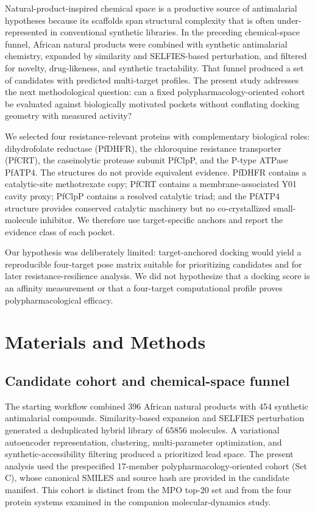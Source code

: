 \documentclass[journal=jcisd8,manuscript=article]{achemso}
\begin{document}
Natural-product-inspired chemical space is a productive source of antimalarial hypotheses because its scaffolds span structural complexity that is often under-represented in conventional synthetic libraries. In the preceding chemical-space funnel, African natural products were combined with synthetic antimalarial chemistry, expanded by similarity and SELFIES-based perturbation, and filtered for novelty, drug-likeness, and synthetic tractability. That funnel produced a set of candidates with predicted multi-target profiles. The present study addresses the next methodological question: can a fixed polypharmacology-oriented cohort be evaluated against biologically motivated pockets without conflating docking geometry with measured activity?

We selected four resistance-relevant proteins with complementary biological roles: dihydrofolate reductase (PfDHFR), the chloroquine resistance transporter (PfCRT), the caseinolytic protease subunit PfClpP, and the P-type ATPase PfATP4. The structures do not provide equivalent evidence. PfDHFR contains a catalytic-site methotrexate copy; PfCRT contains a membrane-associated Y01 cavity proxy; PfClpP contains a resolved catalytic triad; and the PfATP4 structure provides conserved catalytic machinery but no co-crystallized small-molecule inhibitor. We therefore use target-specific anchors and report the evidence class of each pocket.

Our hypothesis was deliberately limited: target-anchored docking would yield a reproducible four-target pose matrix suitable for prioritizing candidates and for later resistance-resilience analysis. We did not hypothesize that a docking score is an affinity measurement or that a four-target computational profile proves polypharmacological efficacy.

\section{Materials and Methods}
\subsection{Candidate cohort and chemical-space funnel}
The starting workflow combined \num{396} African natural products with \num{454} synthetic antimalarial compounds. Similarity-based expansion and SELFIES perturbation generated a deduplicated hybrid library of \num{65856} molecules. A variational autoencoder representation, clustering, multi-parameter optimization, and synthetic-accessibility filtering produced a prioritized lead space. The present analysis used the prespecified 17-member polypharmacology-oriented cohort (Set C), whose canonical SMILES and source hash are provided in the candidate manifest. This cohort is distinct from the MPO top-20 set and from the four protein systems examined in the companion molecular-dynamics study.
\end{document}

